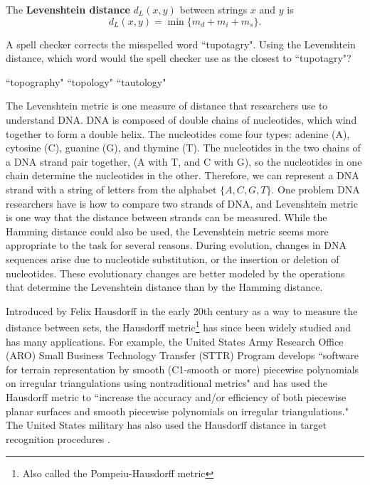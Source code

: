 \begin{definition} The \textbf{Levenshtein distance} $d_L(x,y)$ between strings $x$ and $y$ is 
\[d_L(x,y) = \min\{m_d+m_i+m_s\}.\]
\end{definition}

\begin{activity} A spell checker corrects the misspelled word ``tupotagry". Using the Levenshtein distance, which word would the spell checker use as the closest to ``tupotagry"?
\begin{center} ``topography" \hspace{0.25in} ``topology" \hspace{0.25in} ``tautology" \end{center}

\end{activity}

The Levenshtein metric is one measure of distance that researchers use to understand DNA. DNA is composed of double chains of nucleotides, which wind together to form a double helix. The nucleotides come four types: adenine (A), cytosine (C), guanine (G), and thymine (T). The nucleotides in the two chains of a DNA strand pair together, (A with T, and C with G), so the nucleotides in one chain determine the nucleotides in the other. Therefore, we can represent a DNA strand with a string of letters from the alphabet $\{A, C, G, T\}$. One problem DNA researchers have is how to compare two strands of DNA, and Levenshtein metric is one way that the distance between strands can be measured. While the Hamming distance could also be used, the Levenshtein metric seems more appropriate to the task for several reasons. During evolution, changes in DNA sequences arise due to nucleotide substitution, or the insertion or deletion of nucleotides. These evolutionary changes are better modeled by the operations that determine the Levenshtein distance than by the Hamming distance.  

\label{sec_haus_app}

Introduced by Felix Hausdorff in the early 20th century as a way to measure the distance between sets, the Hausdorff metric\footnote{Also called the Pompeiu-Hausdorff metric} has since been widely studied and has many applications. For example, the United States Army Research Office (ARO) Small Business Technology Transfer (STTR) Program \cite{USArmy} develops ``software for terrain representation by smooth (C1-smooth or more) piecewise polynomials on irregular triangulations using nontraditional metrics" and has used the  Hausdorff metric to ``increase the accuracy and/or efficiency of both piecewise planar surfaces and smooth piecewise polynomials on irregular triangulations."  The United States military has also used the Hausdorff distance in target recognition procedures \cite{Olsen}. 

